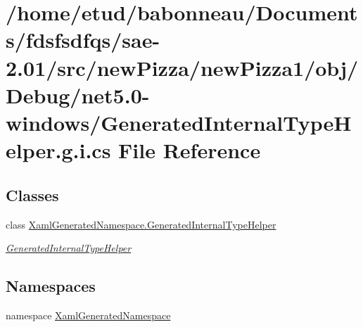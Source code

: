 \hypertarget{net5_80-windows_2GeneratedInternalTypeHelper_8g_8i_8cs}{}\section{/home/etud/babonneau/\+Documents/fdsfsdfqs/sae-\/2.01/src/new\+Pizza/new\+Pizza1/obj/\+Debug/net5.0-\/windows/\+Generated\+Internal\+Type\+Helper.g.\+i.\+cs File Reference}
\label{net5_80-windows_2GeneratedInternalTypeHelper_8g_8i_8cs}
\subsection*{Classes}
\begin{DoxyCompactItemize}
\item 
class \hyperlink{classXamlGeneratedNamespace_1_1GeneratedInternalTypeHelper}{Xaml\+Generated\+Namespace.\+Generated\+Internal\+Type\+Helper}
\begin{DoxyCompactList}\small\item\em \hyperlink{classXamlGeneratedNamespace_1_1GeneratedInternalTypeHelper}{Generated\+Internal\+Type\+Helper} \end{DoxyCompactList}\end{DoxyCompactItemize}
\subsection*{Namespaces}
\begin{DoxyCompactItemize}
\item 
namespace \hyperlink{namespaceXamlGeneratedNamespace}{Xaml\+Generated\+Namespace}
\end{DoxyCompactItemize}
